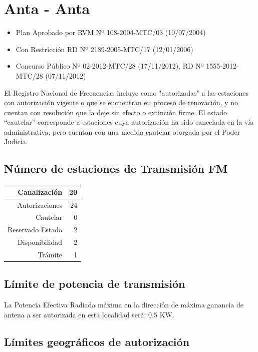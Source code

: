 \documentclass[11pt]{article}
\begin{document}
\section{Anta - Anta}

\begin{itemize}
	\item Plan Aprobado por RVM Nº 108-2004-MTC/03 (10/07/2004)
	\item Con Restricción RD Nº 2189-2005-MTC/17 (12/01/2006)
	\item Concurso Público Nº 02-2012-MTC/28 (17/11/2012), RD Nº 1555-2012-MTC/28 (07/11/2012)
\end{itemize}

El Registro Nacional de Frecuencias incluye como "autorizadas" a las estaciones con autorización vigente o que se encuentran en proceso de renovación, y no cuentan con resolución que la deje sin efecto o extinción firme. El estado “cautelar” corresponde a estaciones cuya autorización ha sido cancelada en la vía administrativa, pero cuentan con una medida cautelar otorgada por el Poder Judicia.

\subsection{Número de estaciones de Transmisión FM}

\begin{tabular}{|r|r|} \hline
	Canalización 			& 20 \\ \hline
	Autorizaciones			& 24 \\ \hline
	Cautelar				& 0 \\ \hline
	Reservado Estado		& 2 \\ \hline
	Disponibilidad			& 2 \\ \hline
	Trámite					& 1 \\ \hline 
\end{tabular}

\subsection{Límite de potencia de transmisión}

La Potencia Efectiva Radiada máxima en la dirección de máxima ganancia de antena a ser autorizada en esta localidad será: 0.5 KW.

\subsection{Límites geográficos de autorización}
\end{document}
